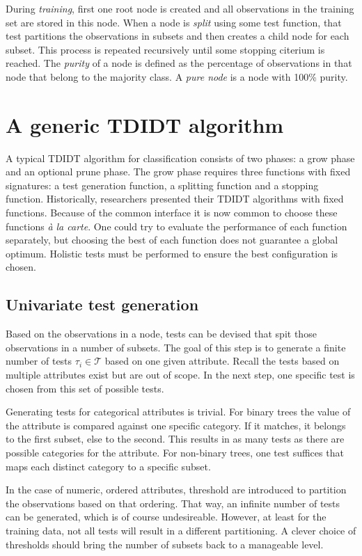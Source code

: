 During \emph{training}, first one root node is created and all observations in the training set are stored in this node. When a node is \emph{split} using some test function, that test partitions the observations in subsets and then creates a child node for each subset. This process is repeated recursively until some stopping citerium is reached. The \emph{purity} of a node is defined as the percentage of observations in that node that belong to the majority class. A \emph{pure node} is a node with 100\% purity.

\section{A generic TDIDT algorithm}
A typical TDIDT algorithm for classification consists of two phases: a grow phase and an optional prune phase. The grow phase requires three functions with fixed signatures: a test generation function, a splitting function and a stopping function. Historically, researchers presented their TDIDT algorithms with fixed functions. Because of the common interface it is now common to choose these functions \emph{\`{a} la carte}. One could try to evaluate the performance of each function separately, but choosing the best of each function does not guarantee a global optimum. Holistic tests must be performed to ensure the best configuration is chosen.

\subsection{Univariate test generation}
Based on the observations in a node, tests can be devised that spit those observations in a number of subsets. The goal of this step is to generate a finite number of tests $\tau_i \in \mathcal{T}$ based on one given attribute. Recall the tests based on multiple attributes exist but are out of scope. In the next step, one specific test is chosen from this set of possible tests.

Generating tests for categorical attributes is trivial. For binary trees the value of the attribute is compared against one specific category. If it matches, it belongs to the first subset, else to the second. This results in as many tests as there are possible categories for the attribute. For non-binary trees, one test suffices that maps each distinct category to a specific subset.

In the case of numeric, ordered attributes, threshold are introduced to partition the observations based on that ordering. That way, an infinite number of tests can be generated, which is of course undesireable. However, at least for the training data, not all tests will result in a different partitioning. A clever choice of thresholds should bring the number of subsets back to a manageable level.

